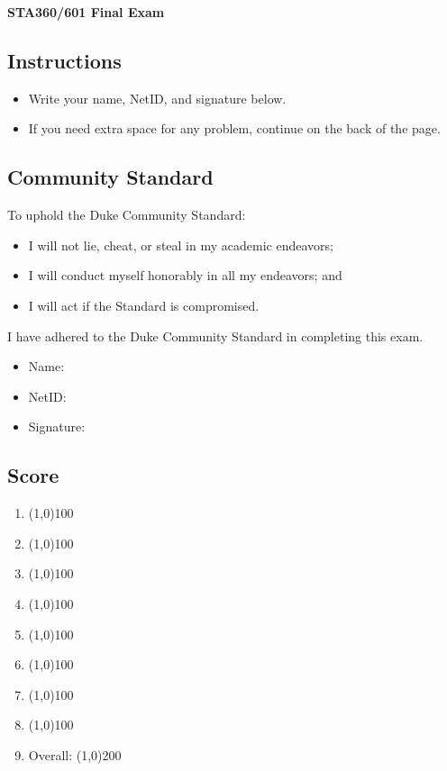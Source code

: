 \documentclass[12pt]{article}
\begin{document}
\begin{center}
\large\textbf{STA360/601 Final Exam}
\end{center}

\small

\subsection*{Instructions}
\begin{itemize}
    \item Write your name, NetID, and signature below.
    \item If you need extra space for any problem, continue on the back of the page.
\end{itemize}

\subsection*{Community Standard}
To uphold the Duke Community Standard:
\begin{itemize}
\item I will not lie, cheat, or steal in my academic endeavors;
\item I will conduct myself honorably in all my endeavors; and
\item I will act if the Standard is compromised.
\end{itemize}
I have adhered to the Duke Community Standard in completing this exam.

\vspace{1em}
\begin{itemize}
    \setlength\itemsep{1em}
    \item[] Name: \hrulefill
    \item[] NetID: \hrulefill
    \item[] Signature: \hrulefill
\end{itemize}

\subsection*{Score}

\vspace{1em}
\begin{enumerate}
    \setlength\itemsep{1em}
    \item \line(1,0){100}
    \item \line(1,0){100}
    \item \line(1,0){100}
    \item \line(1,0){100}
    \item \line(1,0){100}
    \item \line(1,0){100}
    \item \line(1,0){100}
    \item \line(1,0){100}
        \vspace{1em}
    \item[] Overall: \line(1,0){200}
\end{enumerate}
\end{document}
